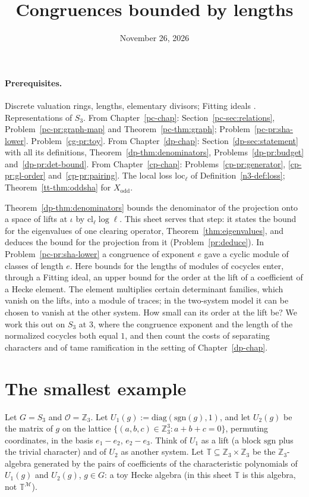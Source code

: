 \documentclass[reqno]{amsart}
\title{Congruences bounded by lengths}
\author{}
\date{November 26, 2026}
\newcounter{chap}
\theoremstyle{definition}
\theoremstyle{plain}
\newcommand{\Z}{\mathbb{Z}}
\newcommand{\Oc}{\mathcal{O}}
\newcommand{\cl}{\mathrm{cl}}
\newcommand{\loc}{\mathrm{loc}}
\newcommand{\Tb}{\mathbb{T}}
\begin{document}
\maketitle
{}\label{chap}

\paragraph{Prerequisites.}
Discrete valuation rings, lengths, elementary divisors; Fitting ideals \cite[\S20.2]{Ei}.  Representations of \(S_3\).  From Chapter~\ref{pc-chap}: Section~\ref{pc-sec:relations}, Problem~\ref{pc-pr:graph-map} and Theorem~\ref{pc-thm:graph}; Problem~\ref{pc-pr:sha-lower}.  Problem~\ref{cg-pr:toy}.  From Chapter~\ref{dp-chap}: Section~\ref{dp-sec:statement} with all its definitions, Theorem~\ref{dp-thm:denominators}, Problems~\ref{dp-pr:budget} and~\ref{dp-pr:det-bound}.  From Chapter~\ref{cp-chap}: Problems~\ref{cp-pr:generator}, \ref{cp-pr:gl-order} and~\ref{cp-pr:pairing}.  The local loss \(\loc_\ell\) of Definition~\ref{n3-def:loss}; Theorem~\ref{tt-thm:oddsha} for \(X_{\mathrm{odd}}\).

\medskip
Theorem~\ref{dp-thm:denominators} bounds the denominator of the projection onto a space of lifts at \(\iota\) by \(\cl_\ell\log\ell\).  This sheet serves that step: it states the bound for the eigenvalues of one clearing operator, Theorem~\ref{thm:eigenvalues}, and deduces the bound for the projection from it (Problem~\ref{pr:deduce}).  In Problem~\ref{pc-pr:sha-lower} a congruence of exponent \(e\) gave a cyclic module of classes of length \(e\).  Here bounds for the lengths of modules of cocycles enter, through a Fitting ideal, an upper bound for the order at the lift of a coefficient of a Hecke element.  The element multiplies certain determinant families, which vanish on the lifts, into a module of traces; in the two-system model it can be chosen to vanish at the other system.  How small can its order at the lift be?  We work this out on \(S_3\) at \(3\), where the congruence exponent and the length of the normalized cocycles both equal \(1\), and then count the costs of separating characters and of tame ramification in the setting of Chapter~\ref{dp-chap}.

\section{The smallest example}\label{sec:model}

Let \(G = S_3\) and \(\Oc = \Z_3\).  Let \(U_1(g) := \mathrm{diag}(\mathrm{sgn}(g), 1)\), and let \(U_2(g)\) be the matrix of \(g\) on the lattice \(\{(a,b,c) \in \Z_3^3 : a+b+c = 0\}\), permuting coordinates, in the basis \(e_1 - e_2\), \(e_2 - e_3\).  Think of \(U_1\) as a lift (a block \(\mathrm{sgn}\) plus the trivial character) and of \(U_2\) as another system.  Let \(\Tb \subseteq \Z_3 \times \Z_3\) be the \(\Z_3\)-algebra generated by the pairs of coefficients of the characteristic polynomials of \(U_1(g)\) and \(U_2(g)\), \(g \in G\): a toy Hecke algebra (in this sheet \(\Tb\) is this algebra, not \(\mathbb T^{\mathcal M}\)).
\end{document}
